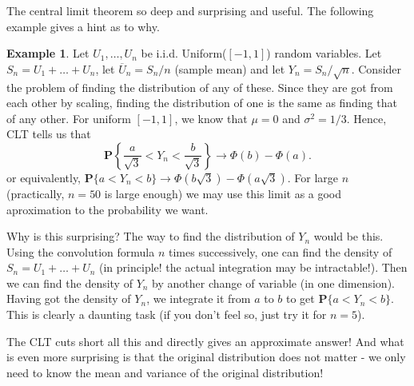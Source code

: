\documentclass[preprint,  11pt]{amsart}
\theoremstyle{plain} %
\theoremstyle{definition} %
\newtheorem{example}[theorem]{Example}
\begin{document}
The central limit theorem so deep and surprising and useful. The following example gives a hint as to why.
\begin{example} Let $U_{1},\ldots ,U_{n}$ be i.i.d. Uniform($[-1,1]$) random variables. Let $S_{n}=U_{1}+\ldots +U_{n}$, let $\overline{U}_{n}=S_{n}/n$ (sample mean) and let $Y_{n}=S_{n}/\sqrt{n}$. Consider the problem of finding the distribution of any of these. Since they are got from each other by scaling, finding the distribution of one is the same as finding that of any other. For uniform $[-1,1]$, we know that $\mu=0$ and ${\sigma}^{2}=1/3$. Hence, CLT tells us that
$$
\mathbf{P}\left\{\frac{a}{\sqrt{3}}<Y_{n}<\frac{b}{\sqrt{3}}\right\}\rightarrow \Phi(b)-\Phi(a).
$$
or equivalently, $\mathbf{P}\{a<Y_{n}<b\}\rightarrow \Phi(b\sqrt{3})-\Phi(a\sqrt{3})$. For large $n$ (practically, $n=50$ is large enough) we may use this limit as a good aproximation to the probability we want.

Why is this surprising? The way to find the distribution of $Y_{n}$ would be this. Using the convolution formula $n$ times successively, one can find the density of $S_{n}=U_{1}+\ldots +U_{n}$ (in principle! the actual integration may be intractable!). Then we can find the density of $Y_{n}$ by another change of variable (in one dimension). Having got the density of $Y_{n}$, we integrate it from $a$ to $b$ to get $\mathbf{P}\{a<Y_{n}<b\}$.  This is clearly a daunting task (if you don't feel so, just try it for $n=5$). 

The CLT cuts short all this and directly gives an approximate answer! And what is even more surprising is that the original distribution does not matter - we only need to know the mean and variance of the original distribution!
\end{example}
%
\end{document}
